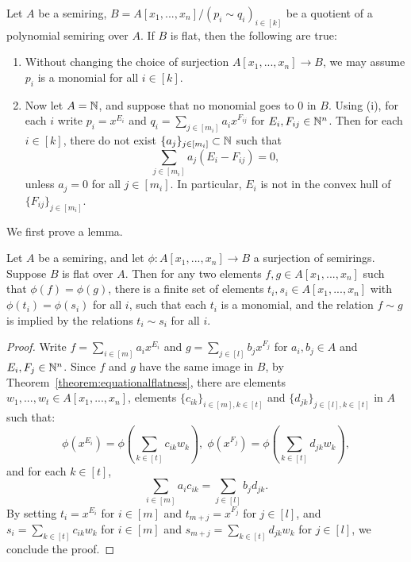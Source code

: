 \begin{corollary}\label{cor:flatquotient}
Let $A$ be a semiring, $B=A[x_1,...,x_n]/(p_i \sim q_i)_{i \in [k]}$ be a quotient of a polynomial semiring over $A$. 
If $B$ is flat, then the following are true:
\begin{enumerate}
\item[(i)] Without changing the choice of surjection $A[x_1,...,x_n] \to B$, we may assume $p_i$ is a monomial for all $i \in [k]$.
\item[(ii)] Now let $A = \mathbb{N}$, and suppose that no monomial goes to $0$ in $B$. 
Using (i), for each $i$ write $p_i=x^{E_i}$ and $q_i = \sum_{j\in [m_i]} a_i x^{F_{ij}}$ for $E_i, F_{ij} \in \mathbb{N}^n$. 
Then for each $i \in [k]$, there do not exist $\{a_j\}_{j \in [m_i]} \subset \mathbb{N}$ such that
\[\sum_{j \in [m_i]} a_j (E_i-F_{ij}) = 0,\]
unless $a_j = 0$ for all $j \in [m_i]$. In particular, $E_i$ is not in the convex hull of $\{F_{ij}\}_{j \in [m_i]}$.
\end{enumerate}
\end{corollary}
We first prove a lemma.
\begin{lemma}\label{lemma:flatmonomial}
Let $A$ be a semiring, and let $\phi: A[x_1,...,x_n] \to B$ a surjection of semirings. Suppose $B$ is flat over $A$. 
Then for any two elements $f,g \in A[x_1,...,x_n]$ such that $\phi(f)=\phi(g)$, there is a finite set of elements $t_i,s_i \in A[x_1,...,x_n]$ with $\phi(t_i)=\phi(s_i)$ for all $i$,
such that each $t_i$ is a monomial, and the relation $f \sim g$ is implied by the relations $t_i \sim s_i$ for all $i$.
\end{lemma}
\begin{proof}
Write $f= \sum_{i\in [m]} a_i x^{E_i}$ and $g = \sum_{j\in [l]} b_j x^{F_j}$ for $a_i,b_j \in A$ and $E_i, F_j \in \mathbb{N}^n$. Since $f$ and $g$ have the same image in $B$, 
by Theorem~\ref{theorem:equationalflatness}, 
there are elements $w_1,...,w_t \in A[x_1,...,x_n]$, elements $\{c_{ik}\}_{i \in [m], k \in [t]}$ and $\{d_{jk}\}_{j \in [l], k \in [t]}$ in $A$ such that:
\[\phi(x^{E_i}) = \phi\left(\sum_{k \in [t]} c_{ik} w_k\right), \; \phi(x^{F_j}) = \phi\left(\sum_{k \in [t]} d_{jk} w_k\right),\]
and for each $k \in [t]$,
\[\sum_{i\in [m]} a_i c_{ik} = \sum_{j\in [l]} b_j d_{jk}.\]
By setting $t_i=x^{E_i}$ for $i \in [m]$ and $t_{m+j} = x^{F_j}$ for $j \in [l]$, and $s_i = \sum_{k \in [t]} c_{ik} w_k$ for $i \in [m]$ and
$s_{m+j} = \sum_{k \in [t]} d_{jk} w_k$ for $j \in [l]$, we conclude the proof.
\end{proof}
